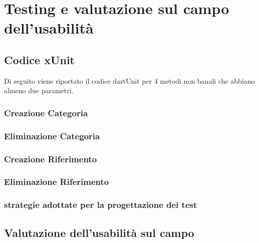 \chapter{Testing e valutazione sul campo dell'usabilità}
\raggedright{\section{Codice xUnit}}
Di seguito viene riportato il codice dartUnit per 4 metodi non banali che abbiano almeno due parametri.\\
\raggedright{\subsection{Creazione Categoria}}

\raggedright{\subsection{Eliminazione Categoria}}

\newpage
\raggedright{\subsection{Creazione Riferimento}}

\raggedright{\subsection{Eliminazione Riferimento}}


\raggedright{\subsection{strategie adottate per la progettazione dei test}}

\raggedright{\section{Valutazione dell'usabilità sul campo}}

